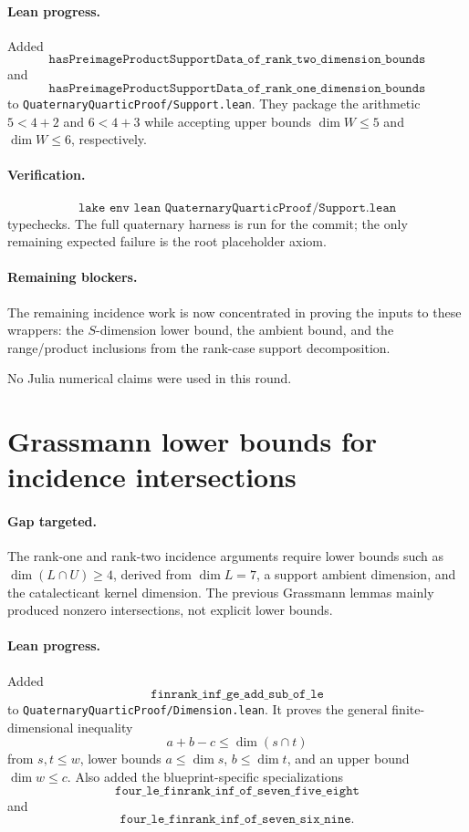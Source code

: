 \documentclass[11pt]{article}
\begin{document}
\paragraph{Lean progress.}
Added
\[
\texttt{hasPreimageProductSupportData\_of\_rank\_two\_dimension\_bounds}
\]
and
\[
\texttt{hasPreimageProductSupportData\_of\_rank\_one\_dimension\_bounds}
\]
to \texttt{QuaternaryQuarticProof/Support.lean}.  They package the arithmetic
\(5<4+2\) and \(6<4+3\) while accepting upper bounds
\(\dim W\le5\) and \(\dim W\le6\), respectively.

\paragraph{Verification.}
\[
\texttt{lake env lean QuaternaryQuarticProof/Support.lean}
\]
typechecks.  The full quaternary harness is run for the commit; the only
remaining expected failure is the root placeholder axiom.

\paragraph{Remaining blockers.}
The remaining incidence work is now concentrated in proving the inputs to
these wrappers: the \(S\)-dimension lower bound, the ambient bound, and the
range/product inclusions from the rank-case support decomposition.

No Julia numerical claims were used in this round.

\section*{Grassmann lower bounds for incidence intersections}

\paragraph{Gap targeted.}
The rank-one and rank-two incidence arguments require lower bounds such as
\(\dim(L\cap U)\ge4\), derived from \(\dim L=7\), a support ambient dimension,
and the catalecticant kernel dimension.  The previous Grassmann lemmas mainly
produced nonzero intersections, not explicit lower bounds.

\paragraph{Lean progress.}
Added
\[
\texttt{finrank\_inf\_ge\_add\_sub\_of\_le}
\]
to \texttt{QuaternaryQuarticProof/Dimension.lean}.  It proves the general
finite-dimensional inequality
\[
a+b-c \le \dim(s\cap t)
\]
from \(s,t\le w\), lower bounds \(a\le\dim s\), \(b\le\dim t\), and an upper
bound \(\dim w\le c\).  Also added the blueprint-specific specializations
\[
\texttt{four\_le\_finrank\_inf\_of\_seven\_five\_eight}
\]
and
\[
\texttt{four\_le\_finrank\_inf\_of\_seven\_six\_nine}.
\]
\end{document}
